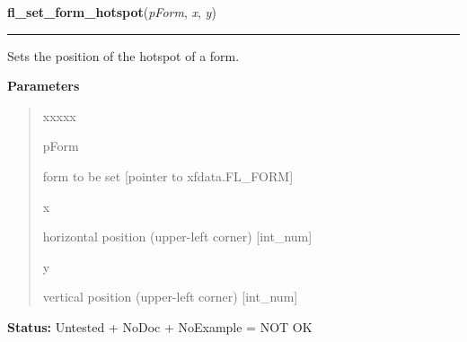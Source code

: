 \hspace{.8\funcindent}\begin{boxedminipage}{\funcwidth}

    \raggedright \textbf{fl\_set\_form\_hotspot}(\textit{pForm}, \textit{x}, \textit{y})

    \vspace{-1.5ex}

    \rule{\textwidth}{0.5\fboxrule}
\setlength{\parskip}{2ex}
    Sets the position of the hotspot of a form.

\setlength{\parskip}{1ex}
      \textbf{Parameters}
      \vspace{-1ex}

      \begin{quote}
        \begin{Ventry}{xxxxx}

          \item[pForm]

          form to be set [pointer to xfdata.FL\_FORM]

          \item[x]

          horizontal position (upper-left corner) [int\_num]

          \item[y]

          vertical position (upper-left corner) [int\_num]

        \end{Ventry}

      \end{quote}

\textbf{Status:} Untested + NoDoc + NoExample = NOT OK



    \end{boxedminipage}

    \label{xformslib:library:fl_set_form_hotobject}

    \vspace{0.5ex}

